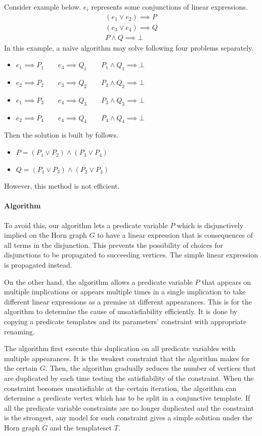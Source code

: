 Consider example below. $e_i$ represents some conjunctions of linear
expressions.
\begin{align*}
(e_1 \vee e_2) \implies P \\ (e_3 \vee e_4) \implies Q \\ P \wedge Q \implies \bot
\end{align*}
In this example, a na\"{i}ve algorithm may solve following four
problems separately.
\begin{itemize}
\item $e_1 \implies P_1 \qquad e_3 \implies Q_1 \qquad P_1 \wedge Q_1 \implies \bot$
\item $e_2 \implies P_2 \qquad e_3 \implies Q_2 \qquad P_2 \wedge Q_2 \implies \bot$
\item $e_1 \implies P_3 \qquad e_4 \implies Q_3 \qquad P_3 \wedge Q_3 \implies \bot$
\item $e_2 \implies P_4 \qquad e_4 \implies Q_4 \qquad P_4 \wedge Q_4 \implies \bot$
\end{itemize}
Then the solution is built by follows.
\begin{itemize}
\item $P = ( P_1 \vee P_2 ) \wedge ( P_3 \vee P_4 )$
\item $Q = ( P_1 \vee P_3 ) \wedge ( P_2 \vee P_4 )$
\end{itemize}
However, this method is not efficient.

\paragraph{Algorithm}
To avoid this, our algorithm lets a predicate variable $P$ which is
disjunctively implied on the Horn graph $G$ to have a linear
expression that is consequences of all terms in the disjunction.  This
prevents the possibility of choices for disjunctions to be propagated
to succeeding vertices. The simple linear expression is propagated
instead.

On the other hand, the algorithm allows a predicate variable $P$ that
appears on multiple implications or appears multiple times in a single
implication to take different linear expressions as a premise at
different appearances.  This is for the algorithm to determine the
cause of unsatisfiability efficiently.  It is done by copying a
predicate templates and its parameters' constraint with appropriate
renaming.

The algorithm first execute this duplication on all predicate
variables with multiple appearances.  It is the weakest constraint
that the algorithm makes for the certain $G$.  Then, the algorithm
gradually reduces the number of vertices that are duplicated by each
time testing the satisfiability of the constraint.  When the
constraint becomes unsatisfiable at the certain iteration, the
algorithm can determine a predicate vertex which has to be split in a
conjunctive template.  If all the predicate variable constraints are
no longer duplicated and the constraint is the strongest, any model
for such constraint gives a simple solution under the Horn graph $G$
and the templateset $T$.

